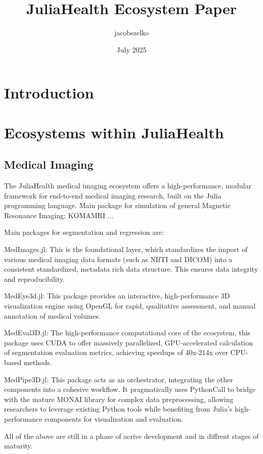 \documentclass{article}
\title{JuliaHealth Ecosystem Paper}
\author{jacobszelko }
\date{July 2025}
\begin{document}
\maketitle

\section{Introduction}

\section{Ecosystems within JuliaHealth}

\subsection{Medical Imaging}
 The JuliaHealth medical imaging ecosystem offers a high-performance, modular framework for end-to-end medical imaging research, built on the Julia programming language. 
Main package for simulation of general Magnetic Resonance Imaging:
KOMAMRI ... 
 
Main packages for segmentation and regression are:

MedImages.jl: This is the foundational layer, which standardizes the import of various medical imaging data formats (such as NIfTI and DICOM) into a consistent standardized, metadata rich data structure. This ensures data integrity and reproducibility.

MedEye3d.jl: This package provides an interactive, high-performance 3D visualization engine using OpenGL for rapid, qualitative assessment, and manual annotation of medical volumes.

MedEval3D.jl: The high-performance computational core of the ecosystem, this package uses CUDA to offer massively parallelized, GPU-accelerated calculation of segmentation evaluation metrics, achieving speedups of 40x-214x over CPU-based methods.

MedPipe3D.jl: This package acts as an orchestrator, integrating the other components into a cohesive workflow. It pragmatically uses PythonCall to bridge with the mature MONAI library for complex data preprocessing, allowing researchers to leverage existing Python tools while benefiting from Julia's high-performance components for visualization and evaluation.

All of the above are still in a phase of acrive development and in diffrent stages of maturity.
\end{document}
